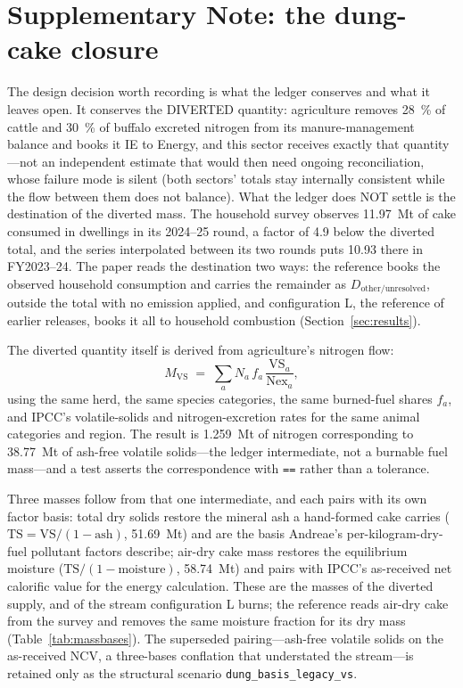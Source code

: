 \section{Supplementary Note: the dung-cake closure}
\label{app:dung}

The design decision worth recording is what the ledger conserves and what it leaves
open. It conserves the DIVERTED quantity: agriculture removes \SI{28}{\percent} of
cattle and \SI{30}{\percent} of buffalo excreted nitrogen from its manure-management
balance and books it IE to Energy, and this sector receives exactly that quantity---not
an independent estimate that would then need ongoing reconciliation, whose failure mode
is silent (both sectors' totals stay internally consistent while the flow between them
does not balance). What the ledger does NOT settle is the destination of the diverted
mass. The household survey observes \SI{11.97}{\mega\tonne} of cake consumed in
dwellings in its 2024--25 round, a factor of \num{4.9} below the diverted total, and the
series interpolated between its two rounds puts \SI{10.93}{} there in FY2023--24. The
paper reads the
destination two ways: the reference books the observed household
consumption and carries the remainder as
$D_{\text{other/unresolved}}$, outside the total with no emission applied, and
configuration L, the reference of earlier releases, books it all to
household combustion (Section~\ref{sec:results}).

The diverted quantity itself is derived from agriculture's nitrogen flow:
\begin{equation}
M_{\mathrm{VS}} \;=\; \sum_{a} N_a \, f_a \, \frac{\mathrm{VS}_a}{\mathrm{Nex}_a},
\end{equation}
using the same herd, the same species categories, the same burned-fuel shares $f_a$, and
IPCC's volatile-solids and nitrogen-excretion rates for the same animal categories and region.
The result is \SI{1.259}{\mega\tonne} of nitrogen corresponding to
\SI{38.77}{\mega\tonne} of ash-free volatile solids---the ledger intermediate, not a
burnable fuel mass---and a test asserts the correspondence with \texttt{==} rather than
a tolerance.

Three masses follow from that one intermediate, and each pairs with its own factor basis:
total dry solids restore the mineral ash a hand-formed cake carries
($\mathrm{TS} = \mathrm{VS}/(1-\text{ash})$, \SI{51.69}{\mega\tonne}) and are the basis
Andreae's per-kilogram-dry-fuel pollutant factors describe; air-dry cake mass restores the
equilibrium moisture ($\mathrm{TS}/(1-\text{moisture})$, \SI{58.74}{\mega\tonne}) and
pairs with IPCC's as-received net calorific value for the energy calculation. These are
the masses of the diverted supply, and of the stream configuration L burns; the reference
reads air-dry cake from the survey and removes the same moisture fraction for its dry
mass (Table~\ref{tab:massbases}). The
superseded pairing---ash-free volatile solids on the as-received NCV, a three-bases
conflation that understated the stream---is retained only as the structural scenario
\texttt{dung\_basis\_legacy\_vs}.

